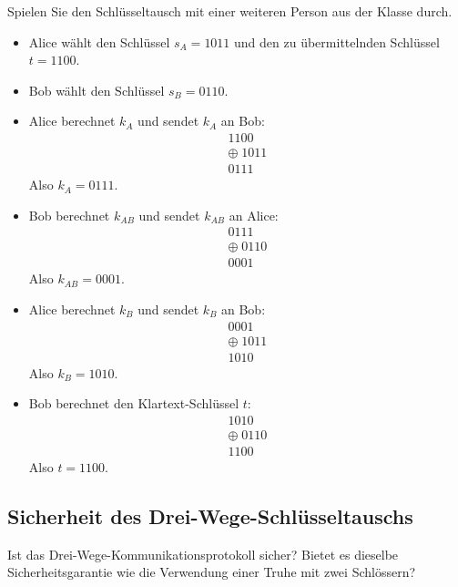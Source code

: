 \begin{myexercise}
	Spielen Sie den Schlüsseltausch mit einer weiteren Person aus der Klasse durch.
	\begin{myanswer}
		\begin{itemize}
			\item Alice wählt den Schlüssel $s_A = 1011$ und den zu übermittelnden Schlüssel $t = 1100$.
			\item Bob wählt den Schlüssel $s_B = 0110$.
			\item Alice berechnet $k_A$ und sendet $k_A$ an Bob:
			      \[
				      \begin{array}{r}
					      1100         \\
					      \oplus\;1011 \\
					      \hline
					      0111
				      \end{array}
			      \]
			      Also $k_A = 0111$.
			\item Bob berechnet $k_{AB}$ und sendet $k_{AB}$ an Alice:
			      \[
				      \begin{array}{r}
					      0111         \\
					      \oplus\;0110 \\
					      \hline
					      0001
				      \end{array}
			      \]
			      Also $k_{AB} = 0001$.
			\item Alice berechnet $k_B$ und sendet $k_B$ an Bob:
			      \[
				      \begin{array}{r}
					      0001         \\
					      \oplus\;1011 \\
					      \hline
					      1010
				      \end{array}
			      \]
			      Also $k_B = 1010$.
			\item Bob berechnet den Klartext-Schlüssel $t$:
			      \[
				      \begin{array}{r}
					      1010         \\
					      \oplus\;0110 \\
					      \hline
					      1100
				      \end{array}
			      \]
			      Also $t = 1100$.
		\end{itemize}
	\end{myanswer}
\end{myexercise}


\subsection*{Sicherheit des Drei-Wege-Schlüsseltauschs}
Ist das Drei-Wege-Kommunikationsprotokoll sicher? Bietet es dieselbe Sicherheitsgarantie wie die Verwendung einer Truhe mit zwei Schlössern?

